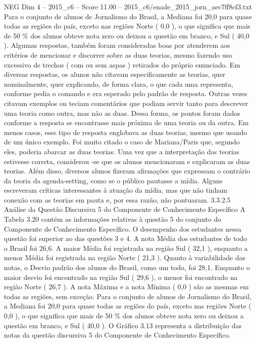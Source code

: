 \begin{textsample}{NEG Dim 4 – 2015\_c6 – Score 11.00 – 2015\_c6/enade\_2015\_jorn\_aec7ff8cf3.txt}
Para o conjunto de alunos de Jornalismo do Brasil, a Mediana foi 20,0 para quase todas as regiões do país, exceto nas regiões Norte ( 0,0 ), o que significa que mais de 50 \% dos alunos obteve nota zero ou deixou a questão em branco, e Sul ( 40,0 ).
Algumas respostas, também foram consideradas boas por atenderem aos critérios de mencionar e discorrer sobre as duas teorias, mesmo fazendo uso excessivo de trechos ( com ou sem aspas ) retirados do próprio enunciado.
Em diversas respostas, os alunos não citavam especificamente as teorias, quer nominalmente, quer explicando, de forma clara, o que cada uma representa, conforme pedia o comando e era esperado pelo padrão de resposta.
Outras vezes citavam exemplos ou teciam comentários que podiam servir tanto para descrever uma teoria como outra, mas não as duas.
Dessa forma, os pontos foram dados conforme a resposta se encontrasse mais próxima de uma teoria ou da outra.
Em menos casos, esse tipo de resposta englobava as duas teorias, mesmo que usando de um único exemplo.
Foi muito citado o caso de Mariana/Paris que, segundo eles, poderia abarcar as duas teorias.
Uma vez que a interpretação das teorias estivesse correta, considerou -se que os alunos mencionaram e explicaram as duas teorias.
Além disso, diversos alunos fizeram afirmações que expressam o contrário da teoria da agenda-setting, como se o público pautasse a mídia.
Alguns escreveram críticas interessantes à atuação da mídia, mas que não tinham conexão com as teorias em pauta e, por essa razão, não pontuaram. 3.3.2.5 Análise da Questão Discursiva 5 do Componente de Conhecimento Específico A Tabela 3.20 contém as informações relativas à questão 5 do conjunto do Componente de Conhecimento Específico.
O desempenho dos estudantes nessa questão foi superior ao das questões 3 e 4.
A nota Média dos estudantes de todo o Brasil foi 26,6.
A maior Média foi registrada na região Sul ( 32,1 ), enquanto a menor Média foi registrada na região Norte ( 21,3 ).
Quanto à variabilidade das notas, o Desvio padrão dos alunos do Brasil, como um todo, foi 28,1.
Enquanto o maior desvio foi encontrado na região Sul ( 29,6 ), o menor foi encontrado na região Norte ( 26,7 ).
A nota Máxima e a nota Mínima ( 0,0 ) são as mesmas em todas as regiões, sem exceção.
Para o conjunto de alunos de Jornalismo do Brasil, a Mediana foi 20,0 para quase todas as regiões do país, exceto nas regiões Norte ( 0,0 ), o que significa que mais de 50 \% dos alunos obteve nota zero ou deixou a questão em branco, e Sul ( 40,0 ).
O Gráfico 3.13 representa a distribuição das notas da questão discursiva 5 do Componente de Conhecimento Específico.

\end{textsample}

